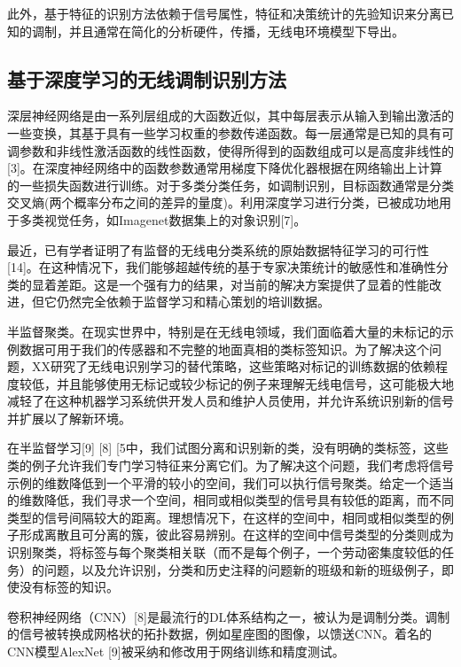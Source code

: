 此外，基于特征的识别方法依赖于信号属性，特征和决策统计的先验知识来分离已知的调制，并且通常在简化的分析硬件，传播，无线电环境模型下导出。\par

\subsection{基于深度学习的无线调制识别方法}
深层神经网络是由一系列层组成的大函数近似，其中每层表示从输入到输出激活的一些变换，其基于具有一些学习权重的参数传递函数。每一层通常是已知的具有可调参数和非线性激活函数的线性函数，使得所得到的函数组成可以是高度非线性的[3]。在深度神经网络中的函数参数通常用梯度下降优化器根据在网络输出上计算的一些损失函数进行训练。对于多类分类任务，如调制识别，目标函数通常是分类交叉熵(两个概率分布之间的差异的量度)。利用深度学习进行分类，已被成功地用于多类视觉任务，如Imagenet数据集上的对象识别[7]。\par

最近，已有学者证明了有监督的无线电分类系统的原始数据特征学习的可行性[14]。在这种情况下，我们能够超越传统的基于专家决策统计的敏感性和准确性分类的显着差距。这是一个强有力的结果，对当前的解决方案提供了显着的性能改进，但它仍然完全依赖于监督学习和精心策划的培训数据。

半监督聚类。在现实世界中，特别是在无线电领域，我们面临着大量的未标记的示例数据可用于我们的传感器和不完整的地面真相的类标签知识。为了解决这个问题，XX研究了无线电识别学习的替代策略，这些策略对标记的训练数据的依赖程度较低，并且能够使用无标记或较少标记的例子来理解无线电信号，这可能极大地减轻了在这种机器学习系统供开发人员和维护人员使用，并允许系统识别新的信号并扩展以了解新环境。\par

在半监督学习[9] [8] [5中，我们试图分离和识别新的类，没有明确的类标签，这些类的例子允许我们专门学习特征来分离它们。为了解决这个问题，我们考虑将信号示例的维数降低到一个平滑的较小的空间，我们可以执行信号聚类。给定一个适当的维数降低，我们寻求一个空间，相同或相似类型的信号具有较低的距离，而不同类型的信号间隔较大的距离。理想情况下，在这样的空间中，相同或相似类型的例子形成离散且可分离的簇，彼此容易辨别。在这样的空间中信号类型的分类则成为识别聚类，将标签与每个聚类相关联（而不是每个例子，一个劳动密集度较低的任务）的问题，以及允许识别，分类和历史注释的问题新的班级和新的班级例子，即使没有标签的知识。\par

卷积神经网络（CNN）[8]是最流行的DL体系结构之一，被认为是调制分类。调制的信号被转换成网格状的拓扑数据，例如星座图的图像，以馈送CNN。着名的CNN模型AlexNet [9]被采纳和修改用于网络训练和精度测试。 \par

